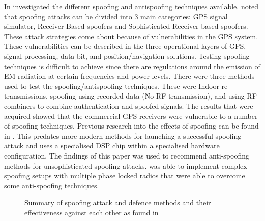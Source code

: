 In \citeyear{RN6} \textcite{RN6} investigated the different spoofing and antispoofing techniques available. \citeauthor{RN6} noted that spoofing attacks can be divided into 3 main categories:
GPS signal simulator, Receiver-Based spoofers and Sophisticated Receiver based spoofers. These attack strategies come about because of vulnerabilities in the GPS system.
These vulnerabilities can be described in the three operational layers of GPS, signal processing, data bit, and position/navigation solutions.
Testing spoofing techniques is difficult to achieve since there are regulations around the emission of EM radiation at certain frequencies and power levels.
There were three methods used to test the spoofing/antispoofing techniques. These were Indoor re-transmissions, spoofing using recorded data (No RF transmission), and
using RF combiners to combine authentication and spoofed signals.
The results that were acquired showed that the commercial GPS receivers were vulnerable to a number of spoofing techniques.
Previous research into the effects of spoofing can be found in \cite{RN23}. This predates more modern methods for launching a successful spoofing attack and uses a
specialised DSP chip within a specialised hardware configuration. The findings of this paper was used to recommend anti-spoofing methods for unsophisticated spoofing
attacks. \citeauthor{RN23} was able to implement complex spoofing setups with multiple phase locked radios that were able to overcome some anti-spoofing techniques. 

\begin{figure}[h]
    \begin{centering}
        \caption{Summary of spoofing attack and defence methods and their effectiveness against each other as found in \cite{RN12}}
    \label{fig:SpoofDefenceSumm}
    \end{centering}
\end{figure}


